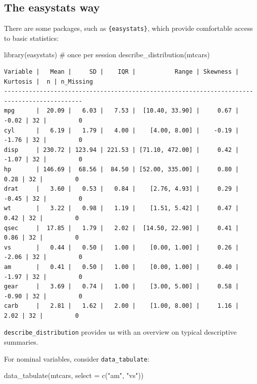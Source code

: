 \documentclass[
  letterpaper,
  DIV=11,
  numbers=noendperiod]{scrreprt}
\newenvironment{Shaded}{\begin{snugshade}}{\end{snugshade}}
\newcommand{\AttributeTok}[1]{\textcolor[rgb]{0.40,0.45,0.13}{#1}}
\newcommand{\CommentTok}[1]{\textcolor[rgb]{0.37,0.37,0.37}{#1}}
\newcommand{\FunctionTok}[1]{\textcolor[rgb]{0.28,0.35,0.67}{#1}}
\newcommand{\NormalTok}[1]{\textcolor[rgb]{0.00,0.23,0.31}{#1}}
\newcommand{\StringTok}[1]{\textcolor[rgb]{0.13,0.47,0.30}{#1}}
\theoremstyle{definition}
\theoremstyle{definition}
\theoremstyle{remark}
\begin{document}
\hypertarget{the-easystats-way}{%
\subsection{The easystats way}\label{the-easystats-way}}

There are some packages, such as \texttt{\{easystats\}}, which provide
comfortable access to basic statistics:

\begin{Shaded}
\begin{Highlighting}[]
\FunctionTok{library}\NormalTok{(easystats)  }\CommentTok{\# once per session}
\FunctionTok{describe\_distribution}\NormalTok{(mtcars)}
\end{Highlighting}
\end{Shaded}

\begin{verbatim}
Variable |   Mean |     SD |    IQR |           Range | Skewness | Kurtosis |  n | n_Missing
--------------------------------------------------------------------------------------------
mpg      |  20.09 |   6.03 |   7.53 |  [10.40, 33.90] |     0.67 |    -0.02 | 32 |         0
cyl      |   6.19 |   1.79 |   4.00 |    [4.00, 8.00] |    -0.19 |    -1.76 | 32 |         0
disp     | 230.72 | 123.94 | 221.53 | [71.10, 472.00] |     0.42 |    -1.07 | 32 |         0
hp       | 146.69 |  68.56 |  84.50 | [52.00, 335.00] |     0.80 |     0.28 | 32 |         0
drat     |   3.60 |   0.53 |   0.84 |    [2.76, 4.93] |     0.29 |    -0.45 | 32 |         0
wt       |   3.22 |   0.98 |   1.19 |    [1.51, 5.42] |     0.47 |     0.42 | 32 |         0
qsec     |  17.85 |   1.79 |   2.02 |  [14.50, 22.90] |     0.41 |     0.86 | 32 |         0
vs       |   0.44 |   0.50 |   1.00 |    [0.00, 1.00] |     0.26 |    -2.06 | 32 |         0
am       |   0.41 |   0.50 |   1.00 |    [0.00, 1.00] |     0.40 |    -1.97 | 32 |         0
gear     |   3.69 |   0.74 |   1.00 |    [3.00, 5.00] |     0.58 |    -0.90 | 32 |         0
carb     |   2.81 |   1.62 |   2.00 |    [1.00, 8.00] |     1.16 |     2.02 | 32 |         0
\end{verbatim}

\texttt{describe\_distribution} provides us with an overview on typical
descriptive summaries.

For nominal variables, consider \texttt{data\_tabulate}:

\begin{Shaded}
\begin{Highlighting}[]
\FunctionTok{data\_tabulate}\NormalTok{(mtcars, }\AttributeTok{select =} \FunctionTok{c}\NormalTok{(}\StringTok{"am"}\NormalTok{, }\StringTok{"vs"}\NormalTok{))}
\end{Highlighting}
\end{Shaded}
\end{document}
